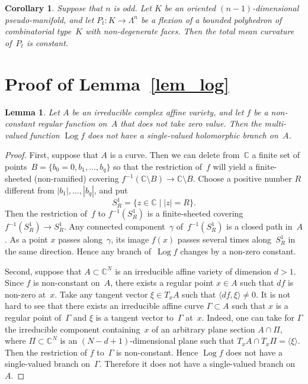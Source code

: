 \documentclass[reqno,tbtags,12pt]{amsart}
\numberwithin{equation}{section}
\newcommand{\C}{\mathbb{C}}
\newcommand{\Log}{\mathop{\mathrm{Log}}\nolimits}
\newtheorem{cor}[theorem]{Corollary}
\newtheorem{lem}[theorem]{Lemma}
\theoremstyle{definition}
\begin{document}
\begin{cor}
Suppose that $n$ is odd. Let $K$ be an oriented $(n-1)$-dimensional pseudo-manifold, and let $P_t\colon K\to\Lambda^n$ be a flexion of a bounded polyhedron of combinatorial type~$K$ with non-degenerate faces. Then the total mean curvature of~$P_t$ is constant.
\end{cor}



\section{Proof of Lemma~\ref{lem_log}}\label{section_Liouville}


\begin{lem}\label{lem_multi_log}
Let $A$ be an irreducible complex affine variety, and let $f$ be a non-constant regular function on~$A$ that does not take zero value. Then  the multi-valued function $\Log f$ does not have a single-valued holomorphic branch on~$A$.  
\end{lem}

\begin{proof}
 First, suppose that $A$ is a curve. Then we can delete from~$\C$ a finite set of points~$B=\{b_0=0,b_1,\ldots,b_q\}$ so that the restriction of~$f$ will yield a finite-sheeted (non-ramified) covering
$
f^{-1}(\C\setminus B)\to\C\setminus B
$. Choose a positive number $R$ different from $|b_1|,\ldots,|b_q|$, and put $$S^1_R=\{z\in\C\mid |z|=R\}.$$ Then the restriction of~$f$ to $f^{-1}(S^1_R)$ is a finite-sheeted covering $f^{-1}(S^1_R)\to S^1_R$. Any connected component~$\gamma$ of~$f^{-1}(S^1_R)$ is a closed path in~$A$. As a point $x$ passes along~$\gamma$, its image $f(x)$ passes several times along~$S^1_R$ in the same direction. Hence any branch of~$\Log f$ changes by a non-zero constant.

Second, suppose that $A\subset\C^N$ is an irreducible affine variety of dimension $d>1$. Since $f$ is non-constant on~$A$, there exists a regular point $x\in A$ such that $df$ is non-zero at~$x$. Take any tangent vector $\xi\in T_xA$ such that $\langle df,\xi\rangle\ne 0$. It is not hard to see that there exists an irreducible affine curve $\Gamma\subset A$ such that $x$ is a regular point of~$\Gamma$ and $\xi$ is a tangent vector to~$\Gamma$ at~$x$. Indeed, one can take for $\Gamma$ the irreducible component containing~$x$ of an arbitrary plane section $A\cap\Pi$, where $\Pi\subset\C^N$ is an $(N-d+1)$-dimensional plane such that $T_xA\cap T_x\Pi=\langle\xi\rangle$. Then the restriction of $f$ to~$\Gamma$ is non-constant. Hence $\Log f$ does not have a single-valued branch on~$\Gamma$. Therefore it does not have a single-valued branch on~$A$.
\end{proof}
\end{document}
